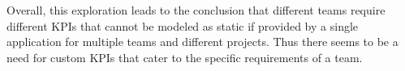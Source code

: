Overall, this exploration leads to the conclusion that different teams require different KPIs that cannot be modeled as static
if provided by a single application for multiple teams and different projects. 
Thus there seems to be a need for custom KPIs that cater to the specific requirements of a team.  